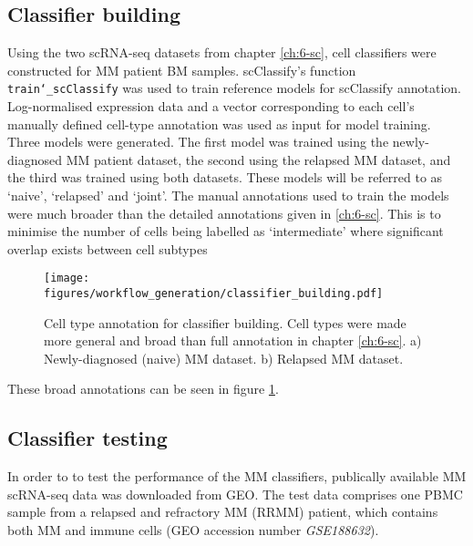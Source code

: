 \subsection{Classifier building}\label{subsec:MM_classifier_model_building}
Using the two scRNA-seq datasets from chapter \ref{ch:6-sc}, cell classifiers were constructed for MM patient BM samples.
scClassify's function \texttt{train\char`_scClassify} was used to train reference models for scClassify annotation.
Log-normalised expression data and a vector corresponding to each cell's manually defined cell-type annotation was used as input for model training.
Three models were generated.
The first model was trained using the newly-diagnosed MM patient dataset, the second using the relapsed MM dataset, and the third was trained using  both datasets.
These models will be referred to as `naive', `relapsed' and `joint'.
The manual annotations used to train the models were much broader than the detailed annotations given in \ref{ch:6-sc}.
This is to minimise the number of cells being labelled as `intermediate' where significant overlap exists between cell subtypes
\begin{figure}[htb]
\centering
\texttt{[image: figures/workflow\_generation/classifier\_building.pdf]}
\caption[Classifier annotation building]{Cell type annotation for classifier building.
Cell types were made more general and broad than full annotation in chapter \ref{ch:6-sc}.
a) Newly-diagnosed (naive) MM dataset.
b) Relapsed MM dataset.}
\label{fig:classifier_building}
\end{figure}
%
These broad annotations can be seen in figure \ref{fig:classifier_building}.

\subsection{Classifier testing}
In order to to test the performance of the MM classifiers, publically available MM scRNA-seq data was downloaded from GEO\@.
The test data comprises one PBMC sample from a relapsed and refractory MM (RRMM) patient, which contains both MM and immune cells (GEO accession number \textit{GSE188632}).

